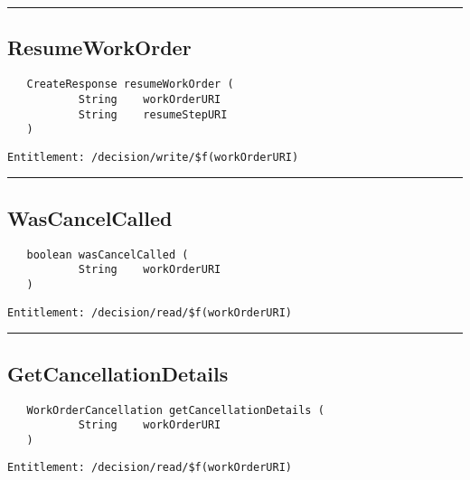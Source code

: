 \rule{12cm}{2pt}
\subsection{ResumeWorkOrder}
\label{Api:ResumeWorkOrder}
\begin{verbatim}
   CreateResponse resumeWorkOrder (
           String    workOrderURI
           String    resumeStepURI
   )
\end{verbatim}
\begin{Verbatim}[fontsize=\small, formatcom=\color{Maroon}]
  Entitlement: /decision/write/$f(workOrderURI)
\end{Verbatim}



\rule{12cm}{2pt}
\subsection{WasCancelCalled}
\label{Api:WasCancelCalled}
\begin{verbatim}
   boolean wasCancelCalled (
           String    workOrderURI
   )
\end{verbatim}
\begin{Verbatim}[fontsize=\small, formatcom=\color{Maroon}]
  Entitlement: /decision/read/$f(workOrderURI)
\end{Verbatim}



\rule{12cm}{2pt}
\subsection{GetCancellationDetails}
\label{Api:GetCancellationDetails}
\begin{verbatim}
   WorkOrderCancellation getCancellationDetails (
           String    workOrderURI
   )
\end{verbatim}
\begin{Verbatim}[fontsize=\small, formatcom=\color{Maroon}]
  Entitlement: /decision/read/$f(workOrderURI)
\end{Verbatim}



